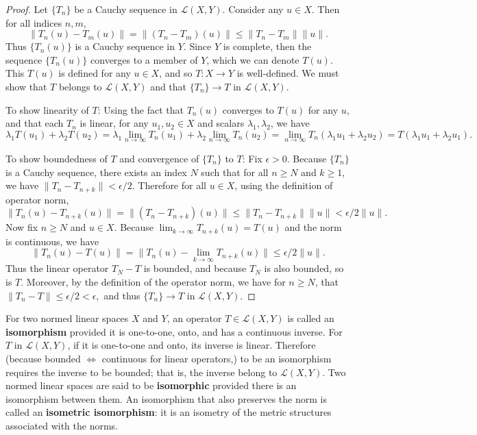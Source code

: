 \begin{proof}
    Let $\{T_n\}$ be a Cauchy sequence in $\mathcal{L}(X,Y)$.
    Consider any $u\in X$.
    Then for all indices $n,m$,
    \[
        \|T_n(u)-T_m(u)\|=\|(T_n-T_m)(u)\|\le\|T_n-T_m\|\|u\|.
    \]  
    Thus $\{T_n(u)\}$ is a Cauchy sequence in $Y$.
    Since $Y$ is complete, then the sequence $\{T_n(u)\}$ converges to a member of $Y$, which we can denote $T(u)$.
    This $T(u)$ is defined for any $u\in X$, and so $T:X\to Y$ is well-defined.
    We must show that $T$ belongs to $\mathcal{L}(X,Y)$ and that $\{T_n\}\to T$ in $\mathcal{L}(X,Y)$.
    
    To show linearity of $T$:
    Using the fact that $T_n(u)$ converges to $T(u)$ for any $u$, and that each $T_n$ is linear, for any $u_1,u_2\in X$ and scalars $\lambda_1,\lambda_2$, we have 
    \[
        \lambda_1T(u_1)+\lambda_2T(u_2)=\lambda_1\lim_{n\to\infty}T_n(u_1)+\lambda_2\lim_{n\to\infty}T_n(u_2)=\lim_{n\to\infty}T_n(\lambda_1u_1+\lambda_2u_2)=T(\lambda_1u_1+\lambda_2u_1).
    \]
    
    To show boundedness of $T$ and convergence of $\{T_n\}$ to $T$:
    Fix $\epsilon>0$.
    Because $\{T_n\}$ is a Cauchy sequence, there exists an index $N$ such that for all $n\ge N$ and $k\ge1$, we have $\|T_n-T_{n+k}\|<\epsilon/2$.
    Therefore for all $u\in X$, using the definition of operator norm,
    \[
        \|T_n(u)-T_{n+k}(u)\|=\|(T_n-T_{n+k})(u)\|\le\|T_n-T_{n+k}\|\|u\|<\epsilon/2\|u\|.
    \]  
    Now fix $n\ge N$ and $u\in X$.
    Because $\lim_{k\to\infty}T_{n+k}(u)=T(u)$ and the norm is continuous, we have
    \[
        \|T_n(u)-T(u)\|=\|T_n(u)-\lim_{k\to\infty}T_{n+k}(u)\|\le\epsilon/2\|u\|.
    \]  
    Thus the linear operator $T_N-T$ is bounded, and because $T_N$ is also bounded, so is $T$.
    Moreover, by the definition of the operator norm, we have for $n\ge N$, that 
    $
        \|T_n-T\|\le\epsilon/2<\epsilon,
    $
    and thus $\{T_n\}\to T$ in $\mathcal{L}(X,Y)$.

\end{proof}

For two normed linear spaces $X$ and $Y$, an operator $T\in\mathcal{L}(X,Y)$ is called an \textbf{isomorphism} provided it is one-to-one, onto, and has a continuous inverse.
For $T$ in $\mathcal{L}(X,Y)$, if it is one-to-one and onto, its inverse is linear.
Therefore (because bounded $\iff$ continuous for linear operators,) to be an isomorphism requires the inverse to be bounded; that is, the inverse belong to $\mathcal{L}(X,Y)$.
Two normed linear spaces are said to be \textbf{isomorphic} provided there is an isomorphism between them.
An isomorphism that also preserves the norm is called an \textbf{isometric isomorphism}: it is an isometry of the metric structures associated with the norms.

